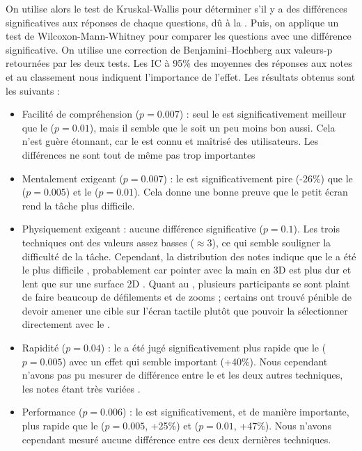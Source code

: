 On utilise alors le test de Kruskal-Wallis pour déterminer s'il y a des différences significatives aux réponses de chaque questions, dû à la . Puis, on applique un test de Wilcoxon-Mann-Whitney pour comparer les questions avec une différence significative. On utilise une correction de Benjamini–Hochberg aux valeurs-p retournées par les deux tests. Les IC à 95\% des moyennes des réponses aux notes  et au classement  nous indiquent l'importance de l'effet. Les résultats obtenus sont les suivants :
\begin{itemize}
  \item Facilité de compréhension ($p = \num{0.007}$) : seul le  est significativement meilleur que le  ($p = \num{0.01}$), mais il semble que le  soit un peu moins bon aussi. Cela n'est guère étonnant, car le  est connu et maîtrisé des utilisateurs. Les différences ne sont tout de même pas trop importantes
  \item Mentalement exigeant ($p = \num{0.007}$) : le  est significativement pire (-26\%) que le  ($p = \num{0.005}$) et le  ($p = \num{0.01}$). Cela donne une bonne preuve que le petit écran rend la tâche plus difficile.
  \item Physiquement exigeant : aucune différence significative ($p = \num{0.1}$). Les trois techniques ont des valeurs assez basses ($\approx$3), ce qui semble souligner la difficulté de la tâche. Cependant, la distribution des notes indique que le  a été le plus difficile , probablement car pointer avec la main en 3D est plus dur et lent que sur une surface 2D \citep{Argelaguet2013}. Quant au , plusieurs participants se sont plaint de faire beaucoup de défilements et de zooms ; certains ont trouvé pénible de devoir amener une cible sur l'écran tactile plutôt que pouvoir la sélectionner directement avec le .
  \item Rapidité ($p = \num{0.04}$) : le  a été jugé significativement plus rapide que le  ($p = \num{0.005}$) avec un effet qui semble important (+40\%). Nous cependant n'avons pas pu mesurer de différence entre le  et les deux autres techniques, les notes étant très variées .
  \item Performance ($p = \num{0.006}$) : le  est significativement, et de manière importante, plus rapide que le  ($p = \num{0.005}$, +25\%) et  ($p = \num{0.01}$, +47\%). Nous n'avons cependant mesuré aucune différence entre ces deux dernières techniques.

\end{itemize}
